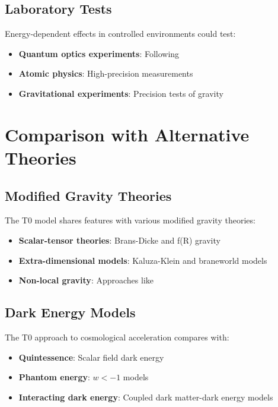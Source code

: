 \documentclass[12pt,a4paper]{article}
\begin{document}
	\subsection{Laboratory Tests}
	\label{subsec:laboratory_tests}
	
	Energy-dependent effects in controlled environments could test:
	\begin{itemize}
		\item \textbf{Quantum optics experiments}: Following \citep{scully1997,knight1998}
		\item \textbf{Atomic physics}: High-precision measurements \citep{demtroder2008}
		\item \textbf{Gravitational experiments}: Precision tests of gravity \citep{will2014,adelberger2003}
	\end{itemize}
	
	\section{Comparison with Alternative Theories}
	\label{sec:alternative_theories}
	
	\subsection{Modified Gravity Theories}
	\label{subsec:modified_gravity}
	
	The T0 model shares features with various modified gravity theories:
	
	\begin{itemize}
		\item \textbf{Scalar-tensor theories}: Brans-Dicke \citep{brans1961} and f(R) gravity \citep{sotiriou2010}
		\item \textbf{Extra-dimensional models}: Kaluza-Klein \citep{kaluza1921,klein1926} and braneworld models \citep{randall1999}
		\item \textbf{Non-local gravity}: Approaches like \citep{woodard2007,koivisto2008}
	\end{itemize}
	
	\subsection{Dark Energy Models}
	\label{subsec:dark_energy_models}
	
	The T0 approach to cosmological acceleration compares with:
	\begin{itemize}
		\item \textbf{Quintessence}: Scalar field dark energy \citep{caldwell1998,steinhardt1999}
		\item \textbf{Phantom energy}: $w < -1$ models \citep{caldwell2003}
		\item \textbf{Interacting dark energy}: Coupled dark matter-dark energy models \citep{amendola2000}
	\end{itemize}
	
\end{document}
